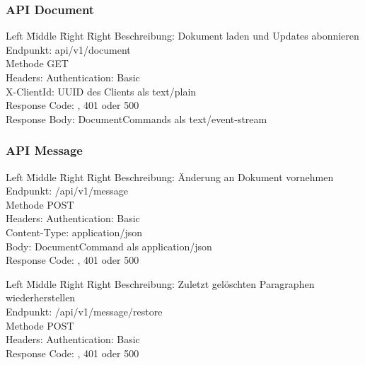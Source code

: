 \subsubsection{API Document}

\begin{tabbing}
    Left \= Middle \= Right \= Right \kill
    Beschreibung:  \> \> \> Dokument laden und Updates abonnieren\\
    Endpunkt:  \> \> \> api/v1/document\\
    Methode \>  \> \> GET\\
    Headers:  \> \>   \> Authentication: Basic\\
    \> \>   \> X-ClientId: UUID des Clients als text/plain\\
    Response Code:  \> \>  , 401 oder 500 \\
    Response Body:  \> \>  \> DocumentCommands als text/event-stream \\
\end{tabbing}


\subsubsection{API Message}

\begin{tabbing}
    Left \= Middle \= Right \= Right \kill
    Beschreibung:  \> \> \> Änderung an Dokument vornehmen\\
    Endpunkt:  \> \> \> /api/v1/message\\
    Methode \>  \> \> POST\\
    Headers:  \> \>   \> Authentication: Basic\\
    \> \>   \> Content-Type: application/json\\
    Body:  \> \>  \> DocumentCommand als application/json\\
    Response Code:  \> \>  , 401 oder 500 \\
\end{tabbing}

\begin{tabbing}
    Left \= Middle \= Right \= Right \kill
    Beschreibung:  \> \> \> Zuletzt gelöschten Paragraphen wiederherstellen \\
    Endpunkt:  \> \> \> /api/v1/message/restore\\
    Methode \>  \> \> POST\\
    Headers:  \> \>   \> Authentication: Basic\\
    Response Code:  \> \>  , 401 oder 500 \\
\end{tabbing}

